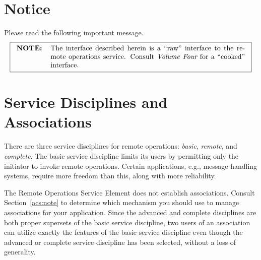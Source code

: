 \section	{Notice}
Please read the following important message.
\[\fbox{\begin{tabular}{lp{0.8\textwidth}}
\bf NOTE:&	The interface described herein is a ``raw'' interface to the
		remote operations service.
		Consult \volfour/ for a ``cooked'' interface.
\end{tabular}}\]

\section	{Service Disciplines and Associations}\label{ros:disciplines}
There are three service disciplines for remote operations:
{\em basic}, {\em remote}, and {\em complete}.
The basic service discipline limits its users by permitting only the
initiator to invoke remote operations.
Certain applications,
e.g., message handling systems,
require more freedom than this,
along with more reliability.

The Remote Operations Service Element does not establish associations.
Consult Section~\ref{acs:note} to determine which mechanism you should use to
manage associations for your application.
Since the advanced and complete disciplines are both proper supersets of the
basic service discipline,
two users of an association can utilize exactly the features of the basic
service discipline even though the advanced or complete service discipline has
been selected,
without a loss of generality.

